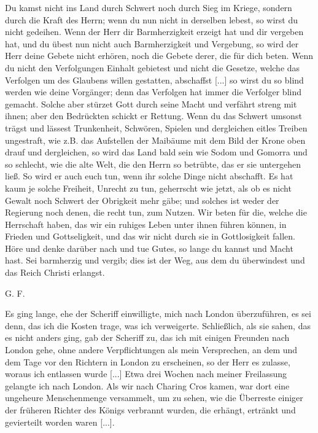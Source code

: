 Du kamst nicht ins Land durch Schwert noch durch Sieg im
Kriege, sondern durch die Kraft des Herrn; wenn du nun nicht
in derselben lebest, so wirst du nicht gedeihen. Wenn der Herr
dir Barmherzigkeit erzeigt hat und dir vergeben hat, und du
übest nun nicht auch Barmherzigkeit und Vergebung, so wird der
Herr deine Gebete nicht erhören, noch die Gebete derer, die für
dich beten. Wenn du nicht den Verfolgungen Einhalt gebietest
und nicht die Gesetze, welche das Verfolgen um des Glaubens
willen gestatten, abschaffst [...] so wirst du so blind werden
wie deine Vorgänger; denn das Verfolgen hat immer die Verfolger 
blind gemacht. Solche aber stürzet Gott durch seine Macht
und verfährt streng mit ihnen; aber den Bedrückten schickt er
Rettung. Wenn du das Schwert umsonst trägst und lässest
Trunkenheit, Schwören, Spielen und dergleichen eitles Treiben
ungestraft, wie z.B. das Aufstellen der Maibäume mit dem Bild
der Krone oben drauf und dergleichen, so wird das Land bald
sein wie Sodom und Gomorra und so schlecht, wie die alte Welt,
die den Herrn so betrübte, das er sie untergehen ließ. So wird
er auch euch tun, wenn ihr solche Dinge nicht abschafft. Es hat
kaum je solche Freiheit, Unrecht zu tun, geherrscht wie jetzt, als
ob es nicht Gewalt noch Schwert der Obrigkeit mehr gäbe; und
solches ist weder der Regierung noch denen, die recht tun, zum
Nutzen. Wir beten für die, welche die Herrschaft haben, das
wir ein ruhiges Leben unter ihnen führen können, in Frieden
und Gottseligkeit, und das wir nicht durch sie in Gottlosigkeit
fallen. Höre und denke darüber nach und tue Gutes, so lange
du kannst und Macht hast. Sei barmherzig und vergib; dies
ist der Weg, aus dem du überwindest und das Reich Christi
erlangst.\grqq{}
\begin{flushright}G. F.\end{flushright}

Es ging lange, ehe der Scheriff einwilligte, mich nach London
überzuführen, es sei denn, das ich die Kosten trage, was ich 
verweigerte. Schließlich, als sie sahen, das es nicht anders ging,
gab der Scheriff zu, das ich mit einigen Freunden nach London
gehe, ohne andere Verpflichtungen als mein Versprechen, an
dem und dem Tage vor den Richtern in London zu erscheinen,
so der Herr es zulasse, woraus ich entlassen wurde [...]
Etwa drei Wochen nach meiner Freilassung gelangte ich nach
London. Als wir nach Charing Cros kamen, war dort eine
ungeheure Menschenmenge versammelt, um zu sehen, wie die
Überreste einiger der früheren Richter des Königs verbrannt
wurden, die erhängt, ertränkt und gevierteilt worden waren [...].

